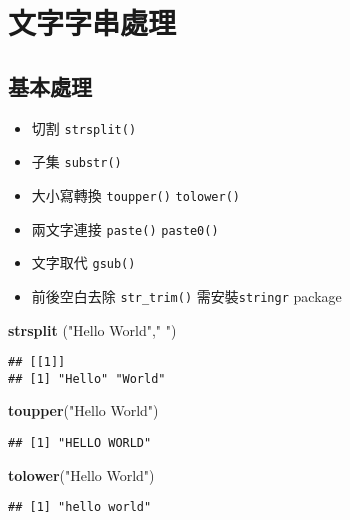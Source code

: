\documentclass[]{book}
\newenvironment{Shaded}{\begin{snugshade}}{\end{snugshade}}
\newcommand{\KeywordTok}[1]{\textcolor[rgb]{0.13,0.29,0.53}{\textbf{{#1}}}}
\newcommand{\StringTok}[1]{\textcolor[rgb]{0.31,0.60,0.02}{{#1}}}
\newcommand{\NormalTok}[1]{{#1}}
\providecommand{\tightlist}{%
  \setlength{\itemsep}{0pt}\setlength{\parskip}{0pt}}
\begin{document}
\section{文字字串處理}

\subsection{基本處理}

\begin{itemize}
\tightlist
\item
  切割 \texttt{strsplit()}
\item
  子集 \texttt{substr()}
\item
  大小寫轉換 \texttt{toupper()} \texttt{tolower()}
\item
  兩文字連接 \texttt{paste()} \texttt{paste0()}
\item
  文字取代 \texttt{gsub()}
\item
  前後空白去除 \texttt{str\_trim()}
  需安裝\texttt{stringr}\citep{R-stringr} package
\end{itemize}

\begin{Shaded}
\begin{Highlighting}[]
\KeywordTok{strsplit} \NormalTok{(}\StringTok{"Hello World"}\NormalTok{,}\StringTok{" "}\NormalTok{)}
\end{Highlighting}
\end{Shaded}

\begin{verbatim}
## [[1]]
## [1] "Hello" "World"
\end{verbatim}

\begin{Shaded}
\begin{Highlighting}[]
\KeywordTok{toupper}\NormalTok{(}\StringTok{"Hello World"}\NormalTok{)}
\end{Highlighting}
\end{Shaded}

\begin{verbatim}
## [1] "HELLO WORLD"
\end{verbatim}

\begin{Shaded}
\begin{Highlighting}[]
\KeywordTok{tolower}\NormalTok{(}\StringTok{"Hello World"}\NormalTok{)}
\end{Highlighting}
\end{Shaded}

\begin{verbatim}
## [1] "hello world"
\end{verbatim}
\end{document}
